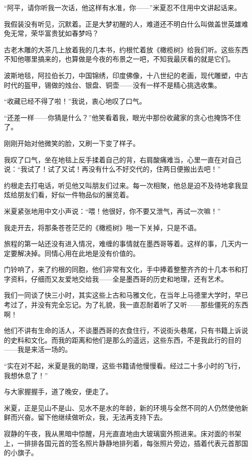 \par “阿平，请你听我一次话，他这样有水准，你——”米夏忍不住用中文讲起话来。
\par 我假装没有听见，沉默着。正是大梦初醒的人，难道还不明白什么叫做盖世英雄难免无常，荣华富贵犹如春梦吗？
\par 古老木雕的大茶几上放着我的几本书，约根忙着放《橄榄树》给我们听。这些东西不知他哪里搞来的，也算做是今夜的布景之一吧，不知我最厌看的就是它们。
\par 波斯地毯，阿拉伯长刀，中国锦绣，印度佛像，十八世纪的老画，现代雕塑，中古时代的盔甲，锡做的烛台、银盘、铜壶——没有一样不是精心挑选收集。
\par “收藏已经不得了啦！”我说，衷心地叹了口气。
\par “还差一样——你猜是什么？”他笑看着我，眼光中那份收藏家的贪心也掩饰不住了。
\par 刚刚开始对他微笑的脸，又刷一下变了样子。
\par 我叹了口气，坐在地毯上反手揉着自己的背，右肩酸痛难当，心里一直在对自己说：“我试了！试了又试！再没有什么不好交代的，住两日便搬出去吧！”
\par 约根走去打电话，听见他又叫朋友们过来。每一次相聚，他总是迫不及待地拿我显炫给朋友们看，好似一件物品似的展览着。
\par 米夏紧张地用中文小声说：“喂！他很好，你不要又泄气，再试一次嘛！”
\par 我走开去，将那条苍苍茫茫的《橄榄树》啪一下关掉，只是不语。
\par 旅程的第一站还没有进入情况，难缠的事情就在墨西哥等着。这样的事，几天内一定要解决掉。同情心用在此地是没有价值的。
\par 门铃响了，来了约根的同胞，他们非常有文化，手中捧着整整齐齐的十几本书和打字资料，仔细而又友爱地交给我——全是墨西哥的历史和地理，还有艺术。
\par 我们一同谈了快三小时，其实这些上古和马雅文化，在当年上马德里大学时，早已考过了，并没有完全忘记。为了礼貌，我一直忍耐着听了又听——那些僵死的东西啊！
\par 他们不讲有生命的活人，不谈墨西哥的衣食住行，不说街头巷尾，只有书籍上诉说的史料和文化。而我的距离和他们是那么的遥远，这些东西，不是我此行的目的——我是来活一场的。
\par “实在对不起，米夏是我的助理，这些书籍请他慢慢看。经过二十多小时的飞行，我想休息了！”
\par 与大家握握手，道了晚安，便走了。
\par 米夏，正是见山不是山、见水不是水的年龄，新的环境与全然不同的人仍然使他新鲜而兴奋。留下他继续做听众，我，无法再支持下去。
\par 寂静的午夜，我从黑暗中惊醒，月光直直地由大玻璃窗外照进来。床对面的书架上，一排排各国元首的签名照片静静地排列着，每张照片旁边，插着代表元首那国的小旗子。
